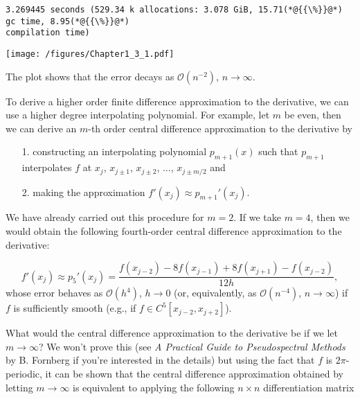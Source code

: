 \documentclass[12pt,landscape]{article}
\begin{document}
{\begin{lstlisting}
3.269445 seconds (529.34 k allocations: 3.078 GiB, 15.71(*@{{\%}}@*) gc time, 8.95(*@{{\%}}@*) 
compilation time)
\end{lstlisting}

\texttt{[image: /figures/Chapter1\_3\_1.pdf]}

The plot shows that the error decays as $\mathcal{O}(n^{-2})$, $n \to \infty$.

To derive a higher order finite difference approximation to the derivative, we can use a higher degree interpolating polynomial.  For example, let $m$ be even, then we can derive an $m$-th order central difference approximation to the derivative by 

\begin{itemize}
\item[1. ] constructing an interpolating polynomial $p_{m+1}(x)$ such that $p_{m+1}$ interpolates $f$ at $x_j$, $x_{j\pm 1}$, $x_{j\pm 2}$, $\ldots$,  $x_{j\pm m/2}$ and 


\item[2. ] making the approximation $f'(x_j) \approx p_{m+1}'(x_j)$. 

\end{itemize}
We have already carried out this procedure for $m = 2$. If we take $m = 4$, then we would obtain the following fourth-order central difference approximation to the derivative:

\[
f'(x_j) \approx p_5'(x_j) = \frac{f(x_{j-2}) -8 f(x_{j-1}) + 8 f(x_{j+1}) - f(x_{j-2})}{12h},
\]
whose error behaves as $\mathcal{O}(h^4)$, $h \to 0$ (or, equivalently, as $\mathcal{O}(n^{-4})$, $n \to \infty$) if $f$ is sufficiently smooth (e.g., if $f \in C^5[x_{j-2}, x_{j+2}]$).

What would the central difference approximation to the derivative be if we let $m \to \infty$? We won't prove this (see \emph{A Practical Guide to Pseudospectral Methods} by B. Fornberg if you're interested in the details) but using the fact that $f$ is $2\pi$-periodic, it can be shown that the central difference approximation obtained by letting $m \to \infty$ is equivalent to applying the following $n \times n$ differentiation matrix

}
\end{document}
